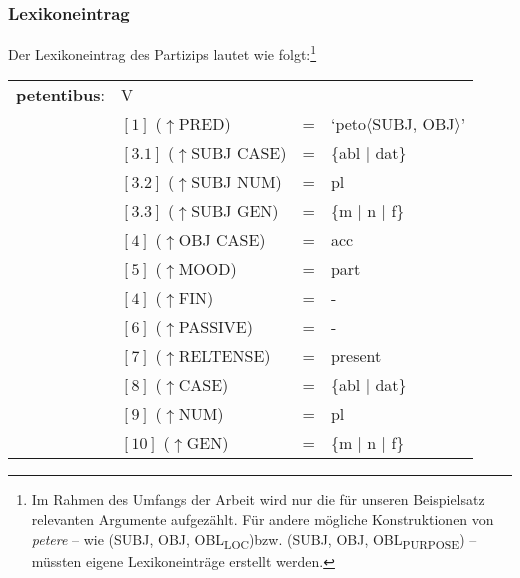 \documentclass[12pt,a4paper]{article}
\begin{document}
\subsubsection{Lexikoneintrag}
Der Lexikoneintrag des Partizips lautet wie folgt:\footnote{Im Rahmen des Umfangs der Arbeit wird nur die für unseren Beispielsatz relevanten Argumente aufgezählt. Für andere mögliche Konstruktionen von \textit{petere} -- wie (SUBJ, OBJ, OBL\textsubscript{LOC})bzw. (SUBJ, OBJ, OBL\textsubscript{PURPOSE}) -- müssten eigene Lexikoneinträge erstellt werden.}
\begin{singlespace}
\begin{tabular}{ l  l  l  l  } 
\textbf{petentibus}: & V \\
$\qquad$ & $[1]$ \:  ($\uparrow$PRED) & = & `peto$\langle$SUBJ, OBJ$\rangle$' \\
$\qquad$ & $[3.1]$ \:  ($\uparrow$SUBJ CASE) & = & \{abl $\mid$ dat\} \\
$\qquad$ & $[3.2]$ \:  ($\uparrow$SUBJ NUM) & = & pl \\
$\qquad$ & $[3.3]$ \:  ($\uparrow$SUBJ GEN) & = & \{m $\mid$ n $\mid$ f\} \\
$\qquad$ & $[4]$ \:  ($\uparrow$OBJ CASE) & = & acc \\
$\qquad$ & $[5]$ \:  ($\uparrow$MOOD) & = & part\\
$\qquad$ & $[4]$ \:  ($\uparrow$FIN) & = & - \\
$\qquad$ & $[6]$ \:  ($\uparrow$PASSIVE) & = & - \\
$\qquad$ & $[7]$ \:  ($\uparrow$RELTENSE) & = & present \\ 
$\qquad$ & $[8]$ \:  ($\uparrow$CASE) & = & \{abl $\mid$ dat\} \\
$\qquad$ & $[9]$ \:  ($\uparrow$NUM) & = & pl \\
$\qquad$ & $[10]$ \:  ($\uparrow$GEN) & = & \{m $\mid$ n $\mid$ f\} \\
\end{tabular}
\newline
\end{singlespace}
\end{document}
